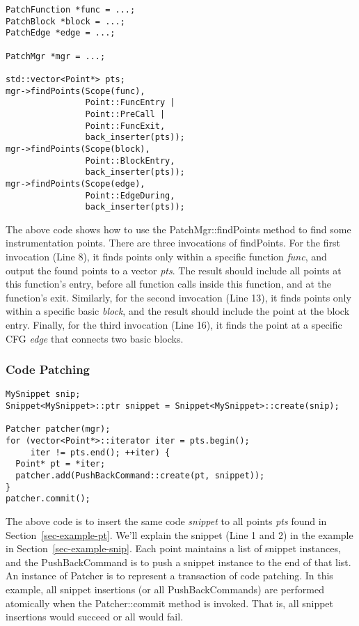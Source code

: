 \lstset{numbers=left}
\begin{lstlisting}
PatchFunction *func = ...;
PatchBlock *block = ...;
PatchEdge *edge = ...;

PatchMgr *mgr = ...;

std::vector<Point*> pts;
mgr->findPoints(Scope(func),
                Point::FuncEntry | 
                Point::PreCall | 
                Point::FuncExit,
                back_inserter(pts));
mgr->findPoints(Scope(block),
                Point::BlockEntry,
                back_inserter(pts));
mgr->findPoints(Scope(edge),
                Point::EdgeDuring,
                back_inserter(pts));
\end{lstlisting}
The above code shows how to use the PatchMgr::findPoints method to find some
instrumentation points. There are three invocations of findPoints. For the first
invocation (Line 8), it finds points only within a specific function
\emph{func}, and output the found points to a vector \emph{pts}. The result
should include all points at this function's entry, before all function calls
inside this function, and at the function's exit. Similarly, for the second
invocation (Line 13), it finds points only within a specific basic \emph{block},
and the result should include the point at the block entry. Finally, for the
third invocation (Line 16), it finds the point at a specific CFG \emph{edge}
that connects two basic blocks.

\subsubsection{Code Patching}

\lstset{numbers=left}
\begin{lstlisting}
MySnippet snip;
Snippet<MySnippet>::ptr snippet = Snippet<MySnippet>::create(snip);

Patcher patcher(mgr);
for (vector<Point*>::iterator iter = pts.begin();
     iter != pts.end(); ++iter) {
  Point* pt = *iter;
  patcher.add(PushBackCommand::create(pt, snippet));
}
patcher.commit();
\end{lstlisting}

The above code is to insert the same code \emph{snippet} to all points
\emph{pts} found in Section~\ref{sec-example-pt}. We'll explain the snippet
(Line 1 and 2) in the example in Section~\ref{sec-example-snip}. Each point
maintains a list of snippet instances, and the PushBackCommand is to push a
snippet instance to the end of that list. An instance of Patcher is to represent
a transaction of code patching. In this example, all snippet insertions (or all
PushBackCommands) are performed atomically when the Patcher::commit method is
invoked. That is, all snippet insertions would succeed or all would fail.

